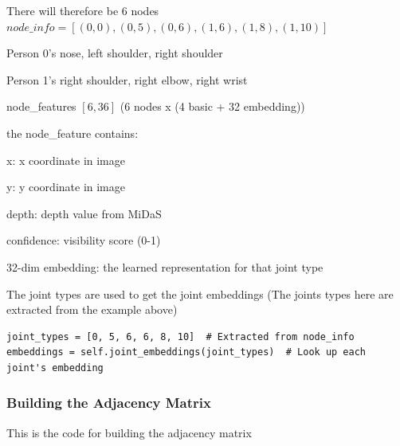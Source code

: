 There will therefore be 6 nodes $node\_info = [(0,0), (0,5), (0,6), (1,6), (1,8), (1,10)]$

\begin{compactitem}
   \item Person 0's nose, left shoulder, right shoulder
   \item Person 1's right shoulder, right elbow, right wrist
\end{compactitem}

node\_features $[6,36]$ (6 nodes x (4 basic + 32 embedding))

the node\_feature contains:

\begin{compactitem}
   \item x: x coordinate in image
   \item y: y coordinate in image
   \item depth: depth value from MiDaS
   \item confidence: visibility score (0-1)
   \item 32-dim embedding: the learned representation for that joint type
\end{compactitem}

The joint types are used to get the joint embeddings (The joints types here are extracted from the example above)

\begin{lstlisting}[style=pythonstyle,title={Preprocessing May get embeddings},label={code:preprocessing_may_get_embeddings}]
joint_types = [0, 5, 6, 6, 8, 10]  # Extracted from node_info
embeddings = self.joint_embeddings(joint_types)  # Look up each joint's embedding
\end{lstlisting}

\subsubsection{Building the Adjacency Matrix}

This is the code for building the adjacency matrix

